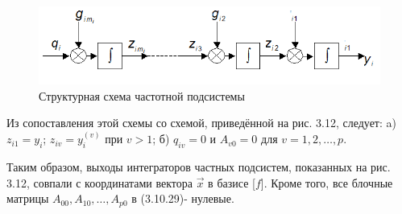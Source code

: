 \begin{figure}[H]
	\centering
	\includegraphics[scale=0.9]{images/Fig3_13}
	\caption{Структурная схема частотной подсистемы}
\end{figure}
Из сопоставления этой схемы со схемой, приведённой на рис. 3.12, следует:
a) $z_{i1}=y_i$; $z_{iv}=y_i^{(v)}$ при $v>1$;
б) $q_{iv}=0$ и $A_{v0}=0$ для $v=1,2,\dots,p$.

Таким образом,  выходы интеграторов частных подсистем, показанных на рис. 3.12, совпали с координатами вектора $\vec{x}$ в базисе [$f$].  Кроме того, все  блочные матрицы $A_{00},A_{10},\dots,A_{p0}$ в (3.10.29)- нулевые. 
